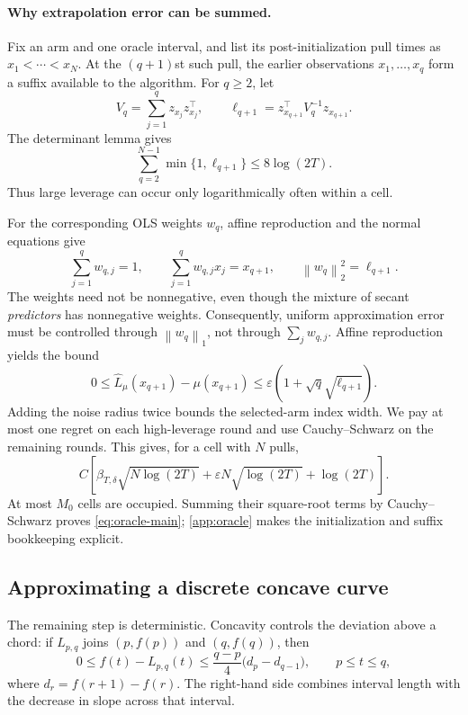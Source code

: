 \documentclass[11pt]{article}
\theoremstyle{remark}
\newcommand{\norm}[1]{\left\lVert #1\right\rVert}
\begin{document}
\paragraph{Why extrapolation error can be summed.}
Fix an arm and one oracle interval, and list its post-initialization pull times as $x_1<\cdots<x_N$. At the $(q+1)$st such pull, the earlier observations $x_1,\ldots,x_q$ form a suffix available to the algorithm. For $q\ge2$, let
\[
V_q=\sum_{j=1}^qz_{x_j}z_{x_j}^\top,
\qquad \ell_{q+1}=z_{x_{q+1}}^\top V_q^{-1}z_{x_{q+1}}.
\]
The determinant lemma gives
\begin{equation}\label{eq:leverage-overview}
\sum_{q=2}^{N-1}\min\{1,\ell_{q+1}\}\le8\log(2T).
\end{equation}
Thus large leverage can occur only logarithmically often within a cell.

For the corresponding OLS weights $w_q$, affine reproduction and the normal equations give
\[
\sum_{j=1}^q w_{q,j}=1,
\qquad \sum_{j=1}^q w_{q,j}x_j=x_{q+1},
\qquad \norm{w_q}_2^2=\ell_{q+1}.
\]
The weights need not be nonnegative, even though the mixture of secant \emph{predictors} has nonnegative weights. Consequently, uniform approximation error must be controlled through $\norm{w_q}_1$, not through $\sum_jw_{q,j}$. Affine reproduction yields the bound
\begin{equation}\label{eq:misspec-overview}
0\le\widehat L_{\mu}(x_{q+1})-\mu(x_{q+1})
\le\varepsilon\left(1+\sqrt q\sqrt{\ell_{q+1}}\right).
\end{equation}
Adding the noise radius twice bounds the selected-arm index width. We pay at most one regret on each high-leverage round and use Cauchy--Schwarz on the remaining rounds. This gives, for a cell with $N$ pulls,
\[
C\left[\beta_{T,\delta}\sqrt{N\log(2T)}
+\varepsilon N\sqrt{\log(2T)}+\log(2T)\right].
\]
At most $M_0$ cells are occupied. Summing their square-root terms by Cauchy--Schwarz proves \eqref{eq:oracle-main}; \cref{app:oracle} makes the initialization and suffix bookkeeping explicit.

\subsection{Approximating a discrete concave curve}

The remaining step is deterministic. Concavity controls the deviation above a chord: if $L_{p,q}$ joins $(p,f(p))$ and $(q,f(q))$, then
\begin{equation}\label{eq:chord-overview}
0\le f(t)-L_{p,q}(t)
\le\frac{q-p}{4}\bigl(d_p-d_{q-1}\bigr),
\qquad p\le t\le q,
\end{equation}
where $d_r=f(r+1)-f(r)$. The right-hand side combines interval length with the decrease in slope across that interval.
\end{document}
